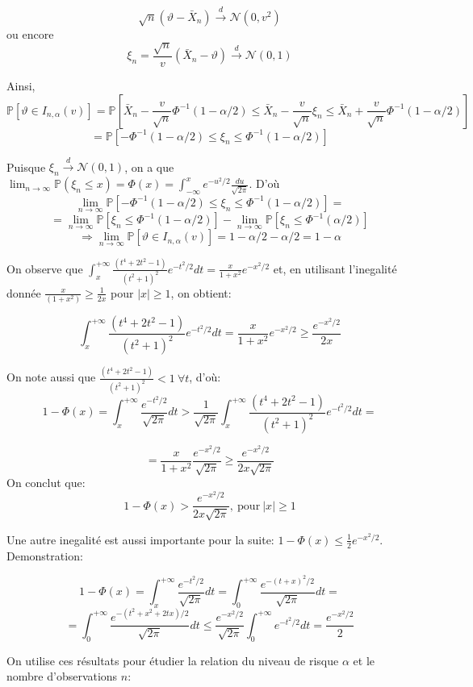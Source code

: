 \documentclass{article}
\begin{document}
$$\sqrt{n}(\vartheta - \bar X_n) \overset{d}{\longrightarrow} \mathcal{N} (0, v^2) $$
ou encore $$\xi_n = \frac{\sqrt{n}}{v}(\bar X_n - \vartheta) \overset{d}{\longrightarrow} \mathcal{N} (0, 1) $$

Ainsi, $$\mathbb{P}[\vartheta \in I_{n,\alpha}(v)]= \mathbb{P}[\bar X_n-\frac{v}{\sqrt{n}}\Phi^{-1}(1-\alpha/2)\leq \bar X_n-\frac{v}{\sqrt{n}}\xi_n\leq\bar X_n+\frac{v}{\sqrt{n}}\Phi^{-1}(1-\alpha/2)]$$
$$=\mathbb{P}[-\Phi^{-1}(1-\alpha/2)\leq \xi_n \leq\Phi^{-1}(1-\alpha/2)]$$

Puisque $\xi_n \overset{d}{\longrightarrow} \mathcal{N} (0, 1)$, on a que $\displaystyle \lim_{n \to \infty}\mathbb{P}(\xi_n \leq x)=\Phi(x) = \int_{-\infty}^xe^{-u^2/2}\frac{du}{\sqrt{2\pi}}$. D'où
$$\lim_{n \to \infty}\mathbb{P}[-\Phi^{-1}(1-\alpha/2)\leq \xi_n \leq\Phi^{-1}(1-\alpha/2)]=$$
$$=\lim_{n \to \infty}\mathbb{P}[\xi_n \leq\Phi^{-1}(1-\alpha/2)]-\lim_{n \to \infty}\mathbb{P}[\xi_n \leq\Phi^{-1}(\alpha/2)]$$
$$\Longrightarrow\lim_{n \to \infty}\mathbb{P}[\vartheta \in I_{n,\alpha}(v)]=1-\alpha/2-\alpha/2=1-\alpha$$

On observe que $\displaystyle\int_{x}^{+\infty}\frac{(t^4+2t^2-1)}{(t^2+1)^2}e^{-t^2/2}dt=\frac{x}{1+x^2}e^{-x^2/2}$ et, en utilisant l'inegalité donnée $\displaystyle\frac{x}{(1+x^2)} \geq \frac{1}{2x}$ pour $\displaystyle |x|\geq 1$, on obtient:

$$\int_{x}^{+\infty}\frac{(t^4+2t^2-1)}{(t^2+1)^2}e^{-t^2/2}dt=\frac{x}{1+x^2}e^{-x^2/2} \geq \frac{e^{-x^2/2}}{2x}$$

On note aussi que $\displaystyle \frac{(t^4+2t^2-1)}{(t^2+1)^2} < 1 \ \forall t$, d'où:
$$1-\Phi(x)=\int_x^{+\infty}\frac{e^{-t^2/2}}{\sqrt{2\pi}}dt > \frac{1}{\sqrt{2\pi}}\int_{x}^{+\infty}\frac{(t^4+2t^2-1)}{(t^2+1)^2}e^{-t^2/2}dt =$$

$$ = \frac{x}{1+x^2}\frac{e^{-x^2/2}}{\sqrt{2\pi}} \geq \frac{e^{-x^2/2}}{2x\sqrt{2\pi}}$$
On conclut que:
$$1-\Phi(x)>\frac{e^{-x^2/2}}{2x\sqrt{2\pi}},\ \mathrm{pour}\ |x| \geq 1$$

Une autre inegalité est aussi importante pour la suite: $\displaystyle 1-\Phi(x) \leq \frac{1}{2} e^{-x^2/2}$. Demonstration:

$$1-\Phi(x) = \int_x^{+\infty} \frac{e^{-t^2/2}}{\sqrt{2\pi}} dt = \int_0^{+\infty} \frac{e^{-(t+x)^2/2}}{\sqrt{2\pi}} dt =$$
$$= \int_0^{+\infty} \frac{e^{-(t^2+x^2+2tx)/2}}{\sqrt{2\pi}} dt \leq \frac{e^{-x^2/2}}{\sqrt{2\pi}} \int_0^{+\infty} e^{-t^2/2} dt = \frac{e^{-x^2/2}}{2} $$

On utilise ces résultats pour étudier la relation du niveau de risque $\displaystyle \alpha$ et le nombre d'observations $\displaystyle n$: \\
\end{document}
